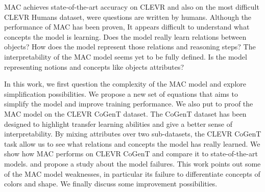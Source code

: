 MAC achieves state-of-the-art accuracy on CLEVR and also on the most difficult CLEVR Humans dataset, were questions are written by humans. 
Although the performance of MAC has been proven, It appears difficult to understand what concepts the model is learning. 
Does the model really learn relations between objects? 
How does the model represent those relations and reasoning steps? 
The interpretability of the MAC model seems yet to be fully defined.
Is the model representing notions and concepts like objects attributes?

In this work, we first question the complexity of the MAC model and explore simplification possibilities. We propose a new set of equations that aims to simplify the model and improve training performance. 
We also put to proof the MAC model on the CLEVR CoGenT dataset. The CoGenT dataset has been designed to highlight transfer learning abilities and give a better sense of interpretability. By mixing attributes over two sub-datasets, the CLEVR CoGenT task allow us to see what relations and concepts the model has really learned. We show how MAC performs on CLEVR CoGenT and compare it to state-of-the-art models.
and propose a study about the model failures. This work points out some of the MAC model weaknesses, in particular its failure to differentiate concepts of colors and shape. We finally discuss some improvement possibilities.
